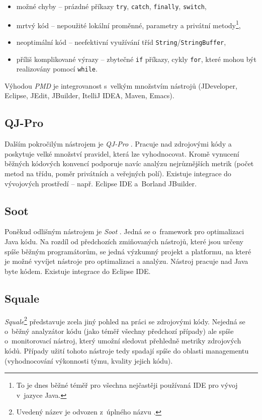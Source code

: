 \begin{itemize}
\item možné chyby -- prázdné příkazy \verb-try-, \verb-catch-, \verb-finally-, \verb-switch-,
\item mrtvý kód -- nepoužité lokální proměnné, parametry a privátní metody\footnote{To je dnes běžné téměř pro všechna nejčastěji používaná IDE pro vývoj v~jazyce Java.},
\item neoptimální kód -- neefektivní využívání tříd \verb+String+/\verb+StringBuffer+,
\item příliš komplikované výrazy -- zbytečné \verb+if+ příkazy, cykly \verb+for+, které mohou být realizovány pomocí \verb+while+.
\end{itemize}

Výhodou \emph{PMD} je integrovanost s~velkým množstvím nástrojů (JDeveloper, Eclipse, JEdit, JBuilder, ItelliJ IDEA, Maven, Emacs).

\subsection{QJ-Pro}
Dalším pokročilým nástrojem je \emph{QJ-Pro} \cite{existingtools:qjpro}. Pracuje nad zdrojovými kódy a poskytuje velké množství pravidel, která lze vyhodnocovat. Kromě vynucení běžných kódových konvencí podporuje navíc analýzu nejrůznějších metrik (počet metod na třídu, poměr privátních a veřejných polí). Existuje integrace do vývojových prostředí -- např. Eclipse IDE a~Borland JBuilder.

\subsection{Soot}
Poněkud odlišným nástrojem je \emph{Soot} \cite{existingtools:soot}. Jedná se o~framework pro optimalizaci Java kódu. Na rozdíl od předchozích zmiňovaných nástrojů, které jsou určeny spíše běžným programátorům, se jedná výzkumný projekt a platformu, na které je možné vyvíjet nástroje pro optimalizaci a analýzu. Nástroj pracuje nad Java byte kódem. Existuje integrace do Eclipse IDE.

\subsection{Squale}
\emph{Squale}\footnote{Uvedený název je odvozen z~úplného názvu .} \cite{existingtools:squale} představuje zcela jiný pohled na práci se zdrojovými kódy. Nejedná se o~běžný analyzátor kódu (jako téměř všechny předchozí případy) ale spíše o~monitorovací nástroj, který umožní sledovat přehledně metriky zdrojových kódů. Případy užití tohoto nástroje tedy spadají spíše do oblasti managementu (vyhodnocování výkonnosti týmu, kvality jejich kódu).

